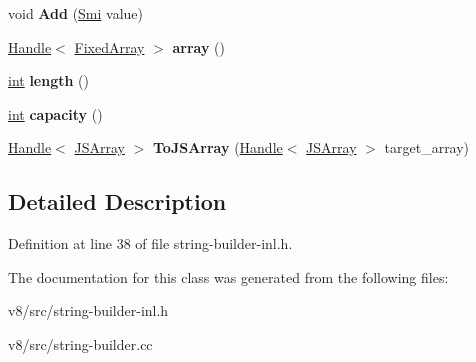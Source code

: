 \begin{DoxyCompactItemize}
void {\bfseries Add} (\mbox{\hyperlink{classv8_1_1internal_1_1Smi}{Smi}} value)
\item 
\mbox{\label{classv8_1_1internal_1_1FixedArrayBuilder_aeb2d267be0c5e6e2e0255d33066729b5}} 
\mbox{\hyperlink{classv8_1_1internal_1_1Handle}{Handle}}$<$ \mbox{\hyperlink{classv8_1_1internal_1_1FixedArray}{Fixed\+Array}} $>$ {\bfseries array} ()
\item 
\mbox{\label{classv8_1_1internal_1_1FixedArrayBuilder_a329de6f0aa5c2c1d7fc52f4e1598401f}} 
\mbox{\hyperlink{classint}{int}} {\bfseries length} ()
\item 
\mbox{\label{classv8_1_1internal_1_1FixedArrayBuilder_a624838799277a1948401049e00084525}} 
\mbox{\hyperlink{classint}{int}} {\bfseries capacity} ()
\item 
\mbox{\label{classv8_1_1internal_1_1FixedArrayBuilder_a8f2f9d50e25134b43c9ded7ce151e3d3}} 
\mbox{\hyperlink{classv8_1_1internal_1_1Handle}{Handle}}$<$ \mbox{\hyperlink{classv8_1_1internal_1_1JSArray}{J\+S\+Array}} $>$ {\bfseries To\+J\+S\+Array} (\mbox{\hyperlink{classv8_1_1internal_1_1Handle}{Handle}}$<$ \mbox{\hyperlink{classv8_1_1internal_1_1JSArray}{J\+S\+Array}} $>$ target\+\_\+array)
\end{DoxyCompactItemize}


\subsection{Detailed Description}


Definition at line 38 of file string-\/builder-\/inl.\+h.



The documentation for this class was generated from the following files\+:\begin{DoxyCompactItemize}
\item 
v8/src/string-\/builder-\/inl.\+h\item 
v8/src/string-\/builder.\+cc\end{DoxyCompactItemize}

